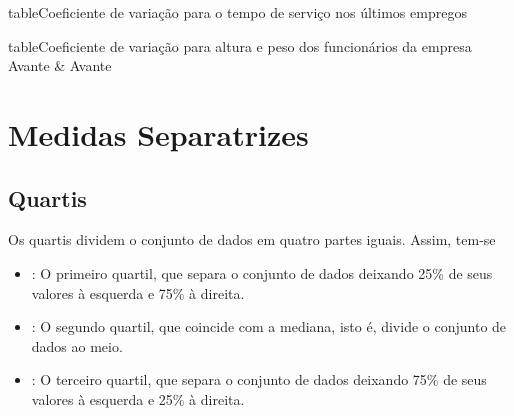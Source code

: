 \documentclass[11pt,fleqn]{book}
\numberwithin{mpicture}{chapter}
\numberwithin{mtable}{chapter}
\numberwithin{mframe}{chapter}
\begin{document}
\begin{pageWidthArea}
	\begin{pageWidthAreaPicture}{table}{Coeficiente de variação para o tempo de serviço nos últimos empregos}
		\label{table:cv_caso2}
	\end{pageWidthAreaPicture}
\end{pageWidthArea}

\begin{pageWidthArea}
	\begin{pageWidthAreaPicture}{table}{Coeficiente de variação para altura e peso dos funcionários da empresa Avante \& Avante}
		\label{table:cv_caso3}
	\end{pageWidthAreaPicture}
\end{pageWidthArea}

\section{Medidas Separatrizes}

\subsection{Quartis}

Os quartis dividem o conjunto de dados em quatro partes iguais. Assim, tem-se
\begin{itemize}
	\item {}: O primeiro quartil, que separa o conjunto de dados deixando 25\% de seus valores à esquerda e 75\% à direita.
	\item {}: O segundo quartil, que coincide com a mediana, isto é, divide o conjunto de dados ao meio.
	\item {}: O terceiro quartil, que separa o conjunto de dados deixando 75\% de seus valores à esquerda e 25\% à direita.
\end{itemize}
\end{document}
